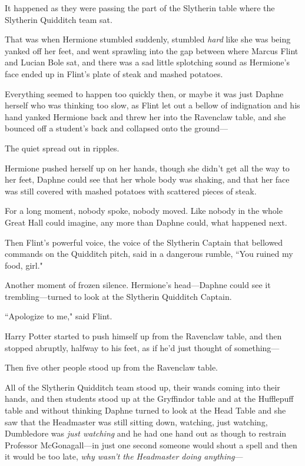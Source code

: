 It happened as they were passing the part of the Slytherin table where the Slytherin Quidditch team sat.

That was when Hermione stumbled suddenly, stumbled \emph{hard} like she was being yanked off her feet, and went sprawling into the gap between where Marcus Flint and Lucian Bole sat, and there was a sad little splotching sound as Hermione's face ended up in Flint's plate of steak and mashed potatoes.

Everything seemed to happen too quickly then, or maybe it was just Daphne herself who was thinking too slow, as Flint let out a bellow of indignation and his hand yanked Hermione back and threw her into the Ravenclaw table, and she bounced off a student's back and collapsed onto the ground—

The quiet spread out in ripples.

Hermione pushed herself up on her hands, though she didn't get all the way to her feet, Daphne could see that her whole body was shaking, and that her face was still covered with mashed potatoes with scattered pieces of steak.

For a long moment, nobody spoke, nobody moved. Like nobody in the whole Great Hall could imagine, any more than Daphne could, what happened next.

Then Flint's powerful voice, the voice of the Slytherin Captain that bellowed commands on the Quidditch pitch, said in a dangerous rumble, ``You ruined my food, girl."

Another moment of frozen silence. Hermione's head—Daphne could see it trembling—turned to look at the Slytherin Quidditch Captain.

``Apologize to me," said Flint.

Harry Potter started to push himself up from the Ravenclaw table, and then stopped abruptly, halfway to his feet, as if he'd just thought of something—

Then five other people stood up from the Ravenclaw table.

All of the Slytherin Quidditch team stood up, their wands coming into their hands, and then students stood up at the Gryffindor table and at the Hufflepuff table and without thinking Daphne turned to look at the Head Table and she saw that the Headmaster was still sitting down, watching, just watching, Dumbledore was \emph{just watching} and he had one hand out as though to restrain Professor McGonagall—in just one second someone would shout a spell and then it would be too late, \emph{why wasn't the Headmaster doing anything}—

